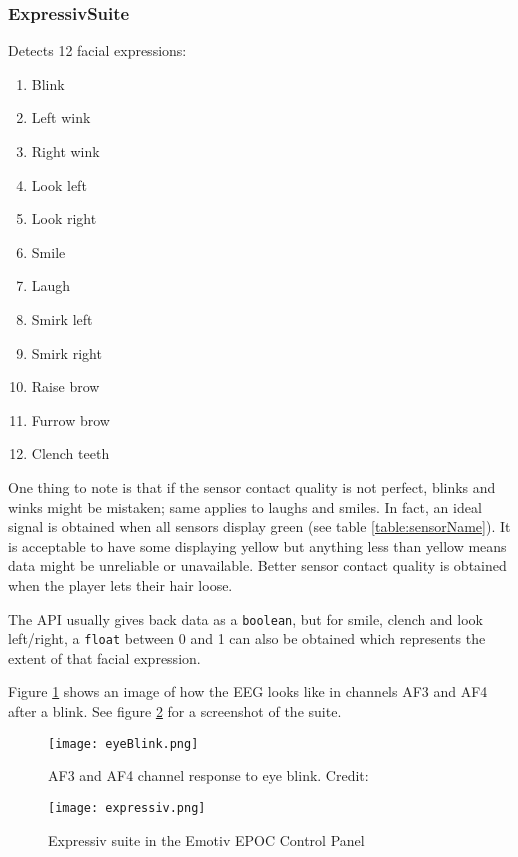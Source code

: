 \subsubsection{Expressiv\texttrademark  Suite}
Detects 12 facial expressions:
\begin{multicols}{2}
\begin{enumerate}
	\item Blink
	\item Left wink
	\item Right wink
	\item Look left
	\item Look right
	\item Smile
	\item Laugh
	\item Smirk left
	\item Smirk right
	\item Raise brow
	\item Furrow brow
	\item Clench teeth
\end{enumerate}
\end{multicols}
One thing to note is that if the sensor contact quality is not perfect, blinks and winks might be mistaken; same applies to laughs and smiles. In fact, an ideal signal is obtained when all sensors display green (see table \ref{table:sensorName}). It is acceptable to have some displaying yellow but anything less than yellow means data might be unreliable or unavailable. Better sensor contact quality is obtained when the player lets their hair loose.
	
The API usually gives back data as a \texttt{boolean}, but for smile, clench and look left/right, a \texttt{float} between 0 and 1 can also be obtained which represents the extent of that facial expression. 

Figure \ref{fig:blinkAF} shows an image of how the EEG looks like in channels AF3 and AF4 after a blink. See figure \ref{fig:expressiv} for a screenshot of the suite.

\begin{figure}
  \centering
  \texttt{[image: eyeBlink.png]}
  \caption{AF3 and AF4 channel response to eye blink. Credit: \cite{experimenterEPOC}}
    \label{fig:blinkAF}           
\end{figure}

\begin{figure}
  \centering
  \texttt{[image: expressiv.png]}
  \caption{Expressiv suite in the Emotiv EPOC Control Panel}
    \label{fig:expressiv}           
\end{figure}

